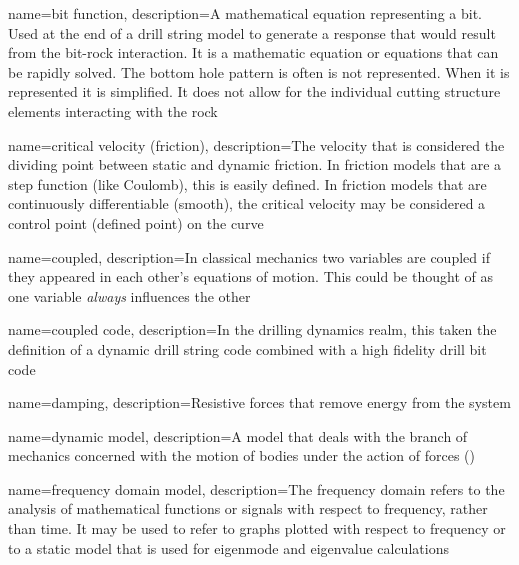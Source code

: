 
\newcommand*{\comma}{,}


{
	name=bit function,
	description=A mathematical equation representing a bit.  Used at the end of a drill string model to generate a response that would result from the bit-rock interaction.  It is a mathematic equation or equations that can be rapidly solved.  The bottom hole pattern is often is not represented.  When it is represented it is simplified.  It does not allow for the individual cutting structure elements interacting with the rock
}

{
	name=critical velocity (friction),
	description=The velocity that is considered the dividing point between static and dynamic friction.  In friction models that are a step function (like Coulomb)\comma{} this is easily defined.  In friction models that are continuously differentiable (smooth)\comma{} the critical velocity may be considered a control point (defined point) on the curve
}

{
	name=coupled,
	description=In classical mechanics two variables are coupled if they appeared in each other's equations of motion.  This could be thought of as one variable \textit{always} influences the other
}

{
	name=coupled code,
	description=In the drilling dynamics realm\comma{} this taken the definition of a dynamic drill string code combined with a high fidelity drill bit code
}

{
	name=damping,
	description=Resistive forces that remove energy from the system
}

{
	name=dynamic model,
	description=A model that deals with the branch of mechanics concerned with the motion of bodies under the action of forces (\dynamicforcebalance)
}

{
	name=frequency domain model,
	description=The frequency domain refers to the analysis of mathematical functions or signals with respect to frequency\comma{} rather than time.  It may be used to refer to graphs plotted with respect to frequency or to a static model that is used for eigenmode and eigenvalue calculations
}

